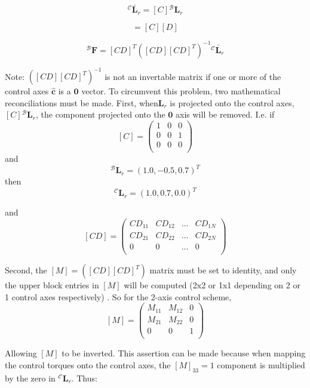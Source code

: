 \begin{equation}
	{}^{\mathcal{C}}\bar{\bm L}_{r} = [C] {}^{\mathcal{B}}\bm L_{r}
\end{equation}

\begin{equation}
	[CD] = [C][D]
\end{equation}

\begin{equation}
	\label{eq:th:min1}
	{}^{\mathcal{B}}\bm F = [CD]^{T}([CD][CD]^{T})^{-1} {}^{\mathcal{C}}\bar{\bm L}_{r}
\end{equation}

Note: $([CD][CD]^{T})^{-1}$ is not an invertable matrix if one or more of the control axes $\hat{\bm c}$ is a $\bm 0$ vector. To circumvent this problem, two mathematical reconciliations must be made. First, when$\bm L_r$ is projected onto the control axes,  $[C] {}^{\mathcal{B}}\bm L_{r}$, the component projected onto the $\bm 0$ axis will be removed. I.e. if
$$ [C] = \begin{pmatrix}
1 & 0 & 0 \\
0 & 0 & 1 \\
0 & 0 & 0 \\
\end{pmatrix} $$
and
$$ \bm {}^{\mathcal B} \bm L_r = (1.0, -0.5, 0.7)^T $$
then
$$ \bm {}^{\mathcal C} \bm L_r = (1.0, 0.7, 0.0)^T $$

and
 $$ [CD] = \begin{pmatrix}
CD_{11} & CD_{12} & \hdots & CD_{1N} \\
CD_{21} & CD_{22} & \hdots & CD_{2N} \\
0 & 0 &  \hdots & 0 \\
\end{pmatrix} $$

Second, the $[M]=([CD][CD]^{T})$ matrix must be set to identity, and only the upper block entries in $[M]$ will be computed (2x2 or 1x1 depending on 2 or 1 control axes respectively) . So for the 2-axis control scheme,
 $$ [M] = \begin{pmatrix}
M_{11} & M_{12} & 0 \\
M_{21} & M_{22} & 0 \\
0 & 0 & 1 \\
\end{pmatrix} $$

Allowing $[M]$ to be inverted. This assertion can be made because when mapping the control torques onto the control axes, the $[M]_{33} =1$ component is multiplied by the zero in ${}^{\mathcal{C}}\bm L_r$. Thus:


